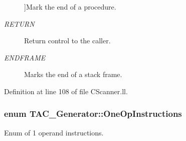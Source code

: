\begin{Desc}
\begin{description}
{}]Mark the end of a procedure. \item[{\em 
\hypertarget{classTAC__Generator_a3942f3e280fb83e44ad85eb13d56dfb5a0e868fa94bac0750a62dfa98d0f56510}{R\-E\-T\-U\-R\-N}\label{classTAC__Generator_a3942f3e280fb83e44ad85eb13d56dfb5a0e868fa94bac0750a62dfa98d0f56510}
}]Return control to the caller. \item[{\em 
\hypertarget{classTAC__Generator_a3942f3e280fb83e44ad85eb13d56dfb5a77c34b42184355e533cdb9105a1c779a}{E\-N\-D\-F\-R\-A\-M\-E}\label{classTAC__Generator_a3942f3e280fb83e44ad85eb13d56dfb5a77c34b42184355e533cdb9105a1c779a}
}]Marks the end of a stack frame. \end{description}
\end{Desc}


Definition at line 108 of file C\-Scanner.\-ll.

\hypertarget{classTAC__Generator_ab58b7044cb5d16a454f4e01514175123}{
\subsubsection[{One\-Op\-Instructions}]{\setlength{\rightskip}{0pt plus 5cm}enum {\bf T\-A\-C\-\_\-\-Generator\-::\-One\-Op\-Instructions}}}\label{classTAC__Generator_ab58b7044cb5d16a454f4e01514175123}


Enum of 1 operand instructions. 

